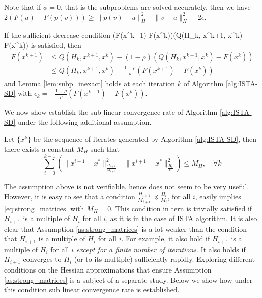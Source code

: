 \documentclass[11pt]{article}
\numberwithin{equation}{section}
\begin{document}
\vskip5mm

Note that if $\phi=0$, that is the subproblems are solved accurately, then we have $2(F(u) - F(p( v))) \geq \|p( v)-u\|_H^2 - \|v-u\|_H^2-2\epsilon$.

If the sufficient decrease  condition 
\bea\label{eq:dec_cond}
(F(x^{k+1})-F(x^k))\leq \rho (Q(H_k, x^{k+1}, x^k)- F(x^k))
\eea
is satisfied, then
\begin{align*}
    F(x^{k+1})
    &\leq Q(H_k, x^{k+1}, x^k)  - (1-\rho) \left( Q(H_k, x^{k+1}, x^k)- F(x^k) \right) \\
    &\leq Q(H_k,  x^{k+1}, x^k)  - \frac{1-\rho}{\rho} (F(x^{k+1})- F(x^k))
\end{align*}
and  Lemma \ref{lem:subp_inexact} holds at each iteration $k$ of Algorithm \ref{alg:ISTA-SD} with  $\epsilon_k=-\frac{1-\rho}{\rho}(F(x^{k+1})- F(x^k))$. 

We now show establish the sub linear convergence rate of Algorithm \ref{alg:ISTA-SD} under the following additional assumption. 
\begin{assumption}\label{as:strong_matrices}
Let $\{x^k\}$ be the sequence of iterates generated by Algorithm \ref{alg:ISTA-SD}, then there exists a constant $M_H$ such that 
 \begin{equation}\label{eq:strong_matrices}
 \sum_{i=0}^{k-1}(\|x^{i+1} - x^*\|^2_\frac{H_{i+1}}{M_{i+1}}-\|x^{i+1} - x^*\|^2_ \frac{H_i}{M_i})\leq M_H, \quad \forall k
 \end{equation}
 \end{assumption}
 
 The assumption above is not verifiable, hence does not seem to be very useful. However, it is easy to see that a condition $\frac{H_{i+1}}{M_{i+1}}\preceq \frac{H_i}{M_i}$, for all $i$, easily implies \eqref{eq:strong_matrices} with $M_H=0$. This condition in tern is trivially satisfied if $H_{i+1}$
 is a multiple of $H_i$ for all $i$, as it is in the case of ISTA algorithm. It is also clear that Assumption \ref{as:strong_matrices} is a lot weaker than
 the condition that $H_{i+1}$ is a multiple of $H_i$ for all $i$. For example, it also hold if $H_{i+1}$ is a multiple of $H_i$ for all $i$ {\em except for a finite number of iterations}. It also holds if $H_{i+1}$ converges to $H_i$ (or to its multiple) sufficiently rapidly. Exploring different conditions on the Hessian approximations that ensure Assumption \ref{as:strong_matrices}  is a subject of a separate study. Below we show how under this condition sub linear convergence rate is established. 
\end{document}
